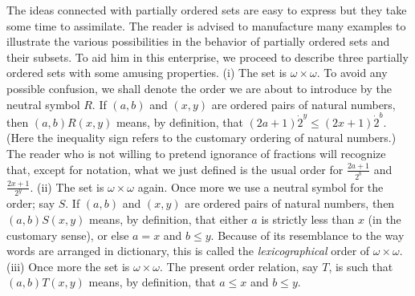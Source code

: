 The ideas connected with partially ordered sets are easy to express but they take some time to assimilate. The reader is advised to manufacture many examples to illustrate the various possibilities in the behavior of partially ordered sets and their subsets. To aid him in this enterprise, we proceed to describe three partially ordered sets with some amusing properties. (i) The set is $\omega \times \omega$. To avoid any possible confusion, we shall denote the order we are about to introduce by the neutral symbol $R$. If $(a,b)$ and $(x, y)$ are ordered pairs of natural numbers, then $(a, b)R(x, y)$ means, by definition, that $(2a + 1) \dot 2^{y} \le (2x + 1) \dot 2^{b}$. (Here the inequality sign refers to the customary ordering of natural numbers.) The reader who is not willing to pretend ignorance of fractions will recognize that, except for notation, what we just defined is the usual order for $\frac{2a + 1}{2^{b}}$ and $\frac{2x + 1}{2^{y}}$. (ii) The set is $\omega \times \omega$ again. Once more we use a neutral symbol for the order; say $S$. If $(a,b)$ and $(x,y)$ are ordered pairs of natural numbers, then $(a,b)S(x,y)$ means, by definition, that either $a$ is strictly less than $x$ (in the customary sense), or else $a = x$ and $b \le y$. Because of its resemblance to the way words are arranged in dictionary, this is called the \textit{lexicographical} order of $\omega \times \omega$. (iii) Once more the set is $\omega \times \omega$. The present order relation, say $T$, is such that $(a,b)T(x,y)$ means, by definition, that $a \le x$ and $b \le y$.